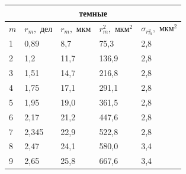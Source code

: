 \documentclass[a4paper,12pt]{article} %
\begin{document}
\begin{table}[h!]
\begin{tabular}{|lllll|}
\hline
\multicolumn{5}{|c|}{темные}                                                                                                                                                                  \\ \hline
\multicolumn{1}{|l|}{$m$} & \multicolumn{1}{l|}{$r_m, \text{ дел}$} & \multicolumn{1}{l|}{$r_m, \text{ мкм}$} & \multicolumn{1}{l|}{$r_m^2, \text{ мкм}^2$} & $\sigma_{r_{m}^2}, \text{ мкм}^2$ \\ \hline
\multicolumn{1}{|l|}{1}   & \multicolumn{1}{l|}{0,89}               & \multicolumn{1}{l|}{8,7}                & \multicolumn{1}{l|}{75,3}                   & 2,8                             \\ \hline
\multicolumn{1}{|l|}{2}   & \multicolumn{1}{l|}{1,2}                & \multicolumn{1}{l|}{11,7}               & \multicolumn{1}{l|}{136,9}                  & 2,8                             \\ \hline
\multicolumn{1}{|l|}{3}   & \multicolumn{1}{l|}{1,51}               & \multicolumn{1}{l|}{14,7}               & \multicolumn{1}{l|}{216,8}                  & 2,8                             \\ \hline
\multicolumn{1}{|l|}{4}   & \multicolumn{1}{l|}{1,75}               & \multicolumn{1}{l|}{17,1}               & \multicolumn{1}{l|}{291,1}                  & 2,8                             \\ \hline
\multicolumn{1}{|l|}{5}   & \multicolumn{1}{l|}{1,95}               & \multicolumn{1}{l|}{19,0}               & \multicolumn{1}{l|}{361,5}                  & 2,8                             \\ \hline
\multicolumn{1}{|l|}{6}   & \multicolumn{1}{l|}{2,17}               & \multicolumn{1}{l|}{21,2}               & \multicolumn{1}{l|}{447,6}                  & 2,8                             \\ \hline
\multicolumn{1}{|l|}{7}   & \multicolumn{1}{l|}{2,345}              & \multicolumn{1}{l|}{22,9}               & \multicolumn{1}{l|}{522,8}                  & 2,8                             \\ \hline
\multicolumn{1}{|l|}{8}   & \multicolumn{1}{l|}{2,47}               & \multicolumn{1}{l|}{24,1}               & \multicolumn{1}{l|}{580,0}                  & 3,4                             \\ \hline
\multicolumn{1}{|l|}{9}   & \multicolumn{1}{l|}{2,65}               & \multicolumn{1}{l|}{25,8}               & \multicolumn{1}{l|}{667,6}                  & 3,4                             \\ \hline

\end{tabular}
\end{table}
\end{document}

